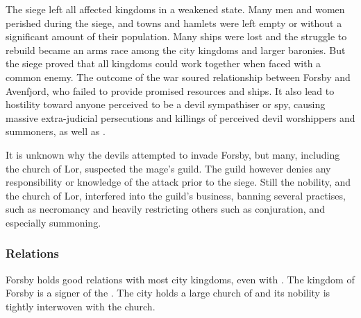 The siege left all affected kingdoms in a weakened state. Many men and women
perished during the siege, and towns and hamlets were left empty or without
a significant amount of their population. Many ships were lost and the
struggle to rebuild became an arms race among the city kingdoms and larger
baronies. But the siege proved that all kingdoms could work together when
faced with a common enemy. The outcome of the war soured relationship between
Forsby and Avenfjord, who failed to provide promised resources and ships. It
also lead to hostility toward anyone perceived to be a devil sympathiser or
spy, causing massive extra-judicial persecutions and killings of perceived
devil worshippers and summoners, as well as .

It is unknown why the devils attempted to invade Forsby, but many, including
the church of Lor, suspected the mage's guild. The guild however denies any
responsibility or knowledge of the attack prior to the siege. Still the
nobility, and the church of Lor, interfered into the guild's business, banning
several practises, such as necromancy and heavily restricting others such as
conjuration, and especially summoning.

\subsubsection{Relations}

Forsby holds good relations with most city kingdoms, even with
. The kingdom of Forsby is a signer of the
. The city holds a large church of 
and its nobility is tightly interwoven with the church.
